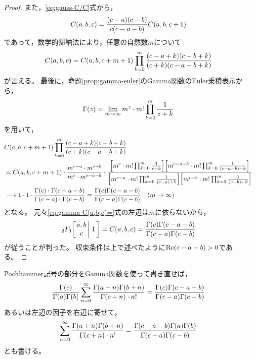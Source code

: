 \documentclass[a4paper,draft]{ltjsarticle}
\begin{document}
\begin{thm}[Kummerの関係]
\begin{proof}
        また，\eqref{eq:gauss-C/C}式から，
        \begin{equation}
            \fun{C}{a,b,c}=\frac{\pare{c-a}\pare{c-b}}{c\pare{c-a-b}}\fun{C}{a,b,c+1}
        \end{equation}
        であって，数学的帰納法により，任意の自然数$m$について
        \begin{equation}
            \fun{C}{a,b,c}=\fun{C}{a,b,c+m+1}\prod_{k=0}^{m}\frac{\pare{c-a+k}\pare{c-b+k}}{\pare{c+k}\pare{c-a-b+k}}
            \label{eq:gamma-C(a,b,c)=}
        \end{equation}
        が言える。
        最後に，命題\ref{prop:gamma-euler}のGamma関数のEuler乗積表示から，
        \begin{equation}
            \fun{\Gamma}{z}=\lim_{m\to\infty}m^z \cdot m!\prod_{k=0}^m\frac{1}{z+k}
        \end{equation}
        を用いて，
        \begin{align}
            &\fun{C}{a,b,c+m+1}\prod_{k=0}^{m}\frac{\pare{c-a+k}\pare{c-b+k}}{\pare{c+k}\pare{c-a-b+k}}
            \\
            &=\fun{C}{a,b,c+m+1}\cdot \frac{m^{c-a}
            \cdot m^{c-b}}{m^{c}\cdot m^{c-a-b}}\cdot \frac{
                \squ{m^c\cdot m!\prod_{k=0}^m\frac{1}{c+k}}\squ{m^{c-a-b}\cdot m!\prod_{k=0}^m\frac{1}{\spare{c-a-b}+k}}
            }{
                \squ{m^{c-a}\cdot m!\prod_{k=0}^m\frac{1}{\spare{c-a}+k}}
                \squ{m^{c-b}\cdot m!\prod_{k=0}^m\frac{1}{\spare{c-b}+k}}
            }
            \\
            &\longrightarrow 1\cdot 1\cdot \frac{\fun{\Gamma}{c}\cdot \fun{\Gamma}{c-a-b}}{\fun{\Gamma}{c-a}\cdot\fun{\Gamma}{c-b}}=\frac{\fun{\Gamma}{c}\fun{\Gamma}{c-a-b}}{\fun{\Gamma}{c-a}\fun{\Gamma}{c-b}}
            \quad\pare{m\to\infty}
        \end{align}
        となる。
        元々\eqref{eq:gamma-C(a,b,c)=}式の左辺は$m$に依らないから，
        \begin{equation}
            \Gauss{a}{b}{c}{1}=\fun{C}{a,b,c}
            =\frac{\fun{\Gamma}{c}\fun{\Gamma}{c-a-b}}{\fun{\Gamma}{c-a}\fun{\Gamma}{c-b}}
        \end{equation}
        が従うことが判った。
        収束条件は上で述べたように$\re{c-a-b}>0$である。
    \end{proof}
\end{thm}

Pochhammer記号の部分をGamma関数を使って書き直せば，
\begin{equation}
    \frac{\fun{\Gamma}{c}}{\fun{\Gamma}{a}\fun{\Gamma}{b}}\sum_{n=0}^\infty \frac{\fun{\Gamma}{a+n}\fun{\Gamma}{b+n}}{\fun{\Gamma}{c+n}\cdot n!}
    =\frac{\fun{\Gamma}{c}\fun{\Gamma}{c-a-b}}{\fun{\Gamma}{c-a}\fun{\Gamma}{c-b}}
\end{equation}
あるいは左辺の因子を右辺に寄せて，
\begin{equation}
    \sum_{n=0}^\infty \frac{\fun{\Gamma}{a+n}\fun{\Gamma}{b+n}}{\fun{\Gamma}{c+n}\cdot n!}
    =\frac{\fun{\Gamma}{c-a-b}\fun{\Gamma}{a}\fun{\Gamma}{b}}{\fun{\Gamma}{c-a}\fun{\Gamma}{c-b}}
\end{equation}
とも書ける。
\end{document}
